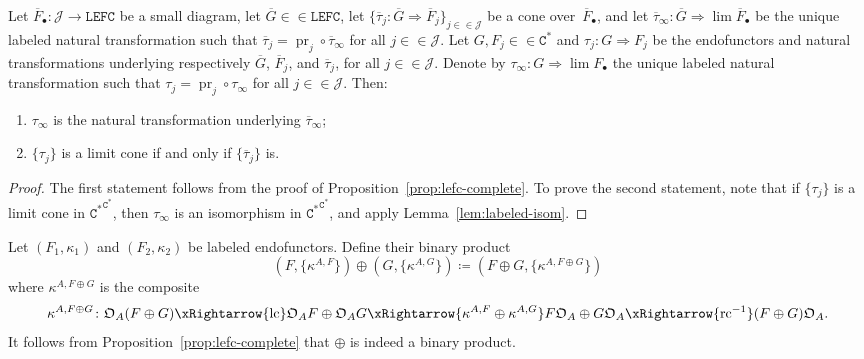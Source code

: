 \documentclass[10pt]{simplearticle}
\newcommand{\pr}{\operatorname{pr}}
\newcommand{\LEFC}{\mathbb{\mathtt{LEFC}}}
\newcommand{\Cstar}{\mathtt{C^{*}}}
\newcommand{\EFC}{\Cstar^{\Cstar}}
\newcommand{\rc}{\operatorname{rc}}
\newcommand{\lc}{\operatorname{lc}}
\begin{document}
\begin{prop}\label{prop:underlying-canon}
Let
$\overline{F}_{\bullet}\colon\mathcal{J}\to\LEFC$
be a small diagram, let $\overline{G}\in\in\LEFC$, let $\{\overline{\tau}_{j}\colon\overline{G}\Rightarrow\overline{F}_{j}\}_{j\in\in\mathcal{J}}$
be a cone over~$\overline{F}_{\bullet}$, and let $\overline{\tau}_{\infty}\colon\overline{G}\Rightarrow\lim\overline{F}_{\bullet}$
be the unique labeled natural transformation such that $\overline{\tau}_{j}=\pr_{j}\circ\overline{\tau}_{\infty}$
for all $j\in\in\mathcal{J}$. Let $G,F_{j}\in\in\Cstar$ and $\tau_{j}\colon G\Rightarrow F_{j}$
be the endofunctors and natural transformations underlying respectively
$\overline{G}$, $\overline{F}_{j}$, and $\overline{\tau}_{j}$,
for all $j\in\in\mathcal{J}$. Denote by $\tau_{\infty}\colon G\Rightarrow\lim F_{\bullet}$
the unique labeled natural transformation such that $\tau_{j}=\pr_{j}\circ\tau_{\infty}$
for all $j\in\in\mathcal{J}$. Then:%
\begin{enumerate}[label=\textup{(\roman*)}]

\item\label{enu:undercanon1}$\tau_{\infty}$ is the natural transformation
underlying $\overline{\tau}_{\infty}$;
\item\label{enu:undercanon2}$\{\tau_{j}\}$ is a limit cone if and only
if $\{\overline{\tau}_{j}\}$ is.
\end{enumerate}
\end{prop}

\begin{proof}
The first statement follows from the proof of Proposition~\ref{prop:lefc-complete}.
To prove the second statement, note that if $\{\tau_{j}\}$ is a limit
cone in $\EFC$, then $\tau_{\infty}$ is an isomorphism in $\EFC$,
and apply Lemma~\ref{lem:labeled-isom}.
\end{proof}

\begin{defn}
Let $(F_{1},\kappa_{1})$ and $(F_{2},\kappa_{2})$ be labeled endofunctors.
Define their binary product
\[
(F,\{\kappa^{A,F}\})\oplus(G,\{\kappa^{A,G}\})\coloneqq(F\oplus G,\{\kappa^{A,F\oplus G}\})
\]
 where $\kappa^{A,F\oplus G}$ is the composite
\[
\kappa^{A,F\oplus G}\colon\mathfrak{O}_{A}(F\oplus G)\xRightarrow{\lc}\mathfrak{O}_{A}F\oplus\mathfrak{O}_{A}G\xRightarrow{\kappa^{A,F}\oplus\kappa^{A,G}}F\mathfrak{O}_{A}\oplus G\mathfrak{O}_{A}\xRightarrow{\rc^{-1}}(F\oplus G)\mathfrak{O}_{A}.
\]
It follows from Proposition~\ref{prop:lefc-complete} that $\oplus$
is indeed a binary product.
\end{defn}
\end{document}
